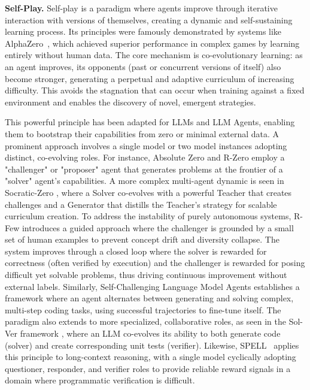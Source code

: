 \documentclass[10pt]{article} %
\begin{document}
\textbf{Self-Play.}
Self-play is a paradigm where agents improve through iterative interaction with versions of themselves, creating a dynamic and self-sustaining learning process. Its principles were famously demonstrated by systems like AlphaZero~\citep{silver2017mastering}, which achieved superior performance in complex games by learning entirely without human data. The core mechanism is co-evolutionary learning: as an agent improves, its opponents (past or concurrent versions of itself) also become stronger, generating a perpetual and adaptive curriculum of increasing difficulty. This avoids the stagnation that can occur when training against a fixed environment and enables the discovery of novel, emergent strategies.

This powerful principle has been adapted for LLMs and LLM Agents, enabling them to bootstrap their capabilities from zero or minimal external data. A prominent approach involves a single model or two model instances adopting distinct, co-evolving roles. For instance, Absolute Zero \citep{zhao2025absolute} and R-Zero \citep{huang2025r} employ a "challenger" or "proposer" agent that generates problems at the frontier of a "solver" agent's capabilities. A more complex multi-agent dynamic is seen in Socratic-Zero \citep{wang2025socratic}, where a Solver co-evolves with a powerful Teacher that creates challenges and a Generator that distills the Teacher's strategy for scalable curriculum creation. To address the instability of purely autonomous systems, R-Few \citep{yu2025guidedself} introduces a guided approach where the challenger is grounded by a small set of human examples to prevent concept drift and diversity collapse.
The system improves through a closed loop where the solver is rewarded for correctness (often verified by execution) and the challenger is rewarded for posing difficult yet solvable problems, thus driving continuous improvement without external labels. 
Similarly, Self-Challenging Language Model Agents \citep{zhou2025selfchallenginglanguagemodelagents} establishes a framework where an agent alternates between generating and solving complex, multi-step coding tasks, using successful trajectories to fine-tune itself. The paradigm also extends to more specialized, collaborative roles, as seen in the Sol-Ver framework \citep{lin2025learningtosolve}, where an LLM co-evolves its ability to both generate code (solver) and create corresponding unit tests (verifier). Likewise, SPELL~\citep{yang2025spell} applies this principle to long-context reasoning, with a single model cyclically adopting questioner, responder, and verifier roles to provide reliable reward signals in a domain where programmatic verification is difficult.
\end{document}
